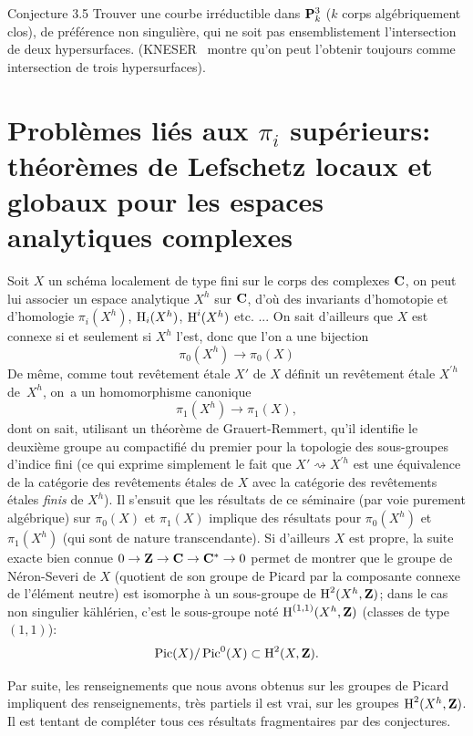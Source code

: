 \label{XIII.3.5}
\begin{enonce*}{Conjecture 3.5\ndemark} Trouver une courbe irr\'eductible dans ${\mathbf P}^3_k$ ($k$ corps alg\'ebriquement clos), de pr\'ef\'erence non singuli\`ere, qui ne soit pas ensemblistement l'intersection de deux hypersurfaces. (KNESER~\cite{XIII.4} montre qu'on peut l'obtenir toujours comme intersection de trois hypersurfaces).
\end{enonce*}
\ignorespaces

\section[Probl\`emes li\'es aux $\pi_i$ sup\'erieurs]{Probl\`emes li\'es aux $\pi_i$ sup\'erieurs: th\'eor\`emes de Lefschetz locaux et globaux pour les espaces analytiques complexes\ndemark} \label{XIII.4}

Soit $X$ un sch\'ema localement de type fini sur le corps des complexes $\mathbf{C}$, on peut lui associer un espace analytique $X^h$ sur $\mathbf{C}$, d'o\`u des invariants d'homotopie et d'homologie $\pi_i(X^h)$, $\operatorname{H}_i(X^h)$, $\operatorname{H}^i(X^h)$ etc. ... On sait d'ailleurs que $X$ est connexe si et seulement si $X^h$ l'est, donc que l'on a une bijection
$$
\pi_0(X^h)\to \pi_0(X)$$
De m\^eme, comme tout rev\^etement \'etale $X'$ de $X$ d\'efinit un rev\^etement \'etale $X^{\prime h}$ de~$X^h$, on~a un homomorphisme canonique
$$
\pi_1(X^h)\to \pi_1(X),
$$
dont on sait, utilisant un th\'eor\`eme de Grauert-Remmert, qu'il identifie le deuxi\`eme groupe au compactifi\'e du premier pour la topologie des sous-groupes d'indice fini (ce qui exprime simplement le fait que $X'\rightsquigarrow X^{\prime h}$ est une \'equivalence de la cat\'egorie des rev\^etements \'etales de $X$ avec la cat\'egorie des rev\^etements \'etales \emph{finis} de $X^h$). Il s'ensuit que les r\'esultats de ce s\'eminaire (par voie purement alg\'ebrique) sur $\pi_0(X)$ et $\pi_1(X)$ implique des r\'esultats pour $\pi_0(X^h)$ et $\pi_1(X^h)$ (qui sont de nature transcendante). Si d'ailleurs $X$ est propre, la suite exacte bien connue $0\to \ZZ \to \CC\to \CC^*\to 0$ permet de montrer que le groupe de N\'eron-Severi de $X$ (quotient de son groupe de Picard par la composante connexe de l'\'el\'ement neutre) est isomorphe \`a un sous-groupe de $\operatorname{H}^2(X^h, \mathbf{Z})$; dans le cas non singulier k\"ahl\'erien, c'est le sous-groupe not\'e $\operatorname{H}^{(1, 1)}(X^h, \mathbf{Z})$ (classes de type $(1, 1)$):
$$
\operatorname{Pic}(X)/\operatorname{Pic}^0(X)\subset \operatorname{H}^2(X, \mathbf{Z}).
$$

Par suite, les renseignements que nous avons obtenus sur les groupes de Picard impliquent des renseignements, tr\`es partiels il est vrai, sur les groupes $\operatorname{H}^2(X^h, \mathbf{Z})$. Il est tentant de compl\'eter tous ces r\'esultats fragmentaires par des conjectures.

